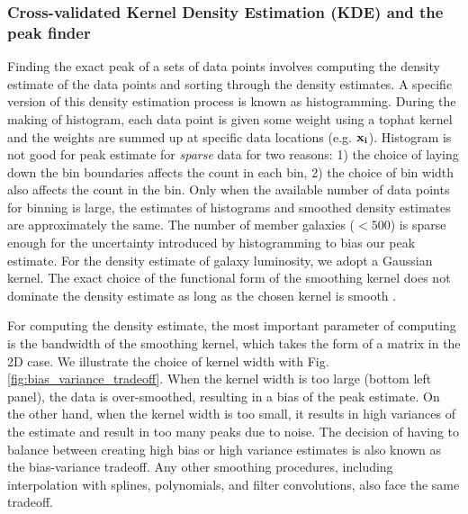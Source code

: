\subsubsection{Cross-validated Kernel Density Estimation (KDE) and the peak finder} 
\label{subsubsec:KDE}
Finding the exact peak of a sets of data points 
involves computing the density estimate of the data points and sorting through
the density estimates. A specific version of this density estimation process is
known as histogramming. During the making of histogram, each data point is
given some weight using a tophat kernel and the weights are summed up at
specific data locations (e.g. $\bf{x}_i$). 
Histogram is not good for peak estimate for {\it sparse} data for two reasons: 1) the
choice of laying down the bin boundaries affects the count in each bin, 2) the choice of
bin width also affects the count in the bin. Only when the available number of data points
for binning is large, the estimates of histograms and smoothed density
estimates are approximately the same. The number of member galaxies ($< 500$) 
is sparse enough for the uncertainty introduced by histogramming to bias our
peak estimate. For the density estimate of galaxy luminosity, 
we adopt a Gaussian kernel. 
The exact choice of the functional form of the smoothing kernel does
not dominate the density estimate as long as the chosen kernel is
smooth \citep{Feigelson2014}. 

For computing the density estimate, the most important parameter of computing 
is the bandwidth of the smoothing kernel, 
which takes the form of a matrix in the 2D case. 
 We illustrate the choice of kernel width with Fig.
\ref{fig:bias_variance_tradeoff}. When the kernel width is
too large (bottom left panel), the data is over-smoothed, 
resulting in a bias of the peak estimate. On the other hand, when the kernel
width is too small, it results in high variances of the estimate and result in
too many peaks due to noise. The decision of having to balance between creating high
bias or high variance estimates is also known as the bias-variance tradeoff. 
Any other smoothing procedures, including interpolation with splines,
polynomials, and filter convolutions, also face the same tradeoff. 

